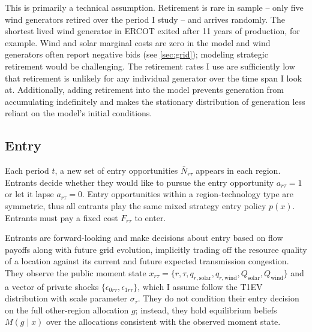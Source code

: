 \documentclass[12pt]{article}
\begin{document}
This is primarily a technical assumption. Retirement is rare in sample -- only five wind generators retired over the period I study -- and arrives randomly. The shortest lived wind generator in ERCOT exited after 11 years of production, for example. Wind and solar marginal costs are zero in the model and wind generators often report negative bids (see \ref{sec:grid}); modeling strategic retirement would be challenging. The retirement rates I use are sufficiently low that retirement is unlikely for any individual generator over the time span I look at. Additionally, adding retirement into the model prevents generation from accumulating indefinitely and makes the stationary distribution of generation less reliant on the model's initial conditions. 

\subsection{Entry}

Each period $t$, a new set of entry opportunities $\bar{N}_{r\tau}$ appears in each region. Entrants decide whether they would like to pursue the entry opportunity $a_{r\tau}=1$ or let it lapse $a_{r\tau}=0$. Entry opportunities within a region-technology type are symmetric, thus all entrants play the same mixed strategy entry policy $p(x)$. Entrants must pay a fixed cost $F_{r\tau}$ to enter. 

Entrants are forward-looking and make decisions about entry based on flow payoffs along with future grid evolution, implicitly trading off the resource quality of a location against its current and future expected transmission congestion. They observe the public moment state $x_{r\tau} = \{r, \tau, q_{r,\mathrm{solar}}, q_{r,\mathrm{wind}}, Q_{\mathrm{solar}}, Q_{\mathrm{wind}}\}$ and a vector of private shocks $\{\epsilon_{0r\tau}, \epsilon_{1r\tau}\}$, which I assume follow the T1EV distribution with scale parameter $\sigma_\tau$. They do not condition their entry decision on the full other-region allocation $g$; instead, they hold equilibrium beliefs $M(g\mid x)$ over the allocations consistent with the observed moment state.
\end{document}
